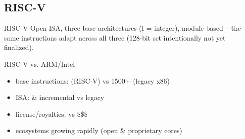 \subsection{RISC-V}

\begin{definition}{RISC-V}
    Open  ISA, three base architectures  (I = integer), module-based -- the same instructions adapt
    across all three (128-bit set intentionally not yet finalized).
\end{definition}

\begin{corollary}{RISC-V vs. ARM/Intel}
    \begin{itemize}
        \item base instructions:  (RISC-V) vs 1500+ (legacy x86)
        \item ISA:  \& incremental vs legacy
        \item license/royalties:  vs \$\$\$
        \item ecosystems growing rapidly (open \& proprietary cores)
    \end{itemize}
\end{corollary}

\raggedcolumns
